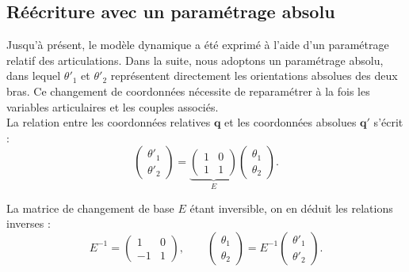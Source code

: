 \documentclass[10pt,a4paper,twocolumn]{article}
\begin{document}
\subsection{Réécriture avec un paramétrage absolu}

Jusqu'à présent, le modèle dynamique a été exprimé à l'aide d'un paramétrage 
relatif des articulations. Dans la suite, nous adoptons un paramétrage absolu, 
dans lequel $\theta'_1$ et $\theta'_2$ représentent directement les orientations 
absolues des deux bras. Ce changement de coordonnées nécessite de reparamétrer 
à la fois les variables articulaires et les couples associés. \\

La relation entre les coordonnées relatives $\mathbf{q}$ et les coordonnées absolues $\mathbf{q'}$ s'écrit :
\begin{equation}
  \begin{pmatrix}
    \theta'_1\\
    \theta'_2
  \end{pmatrix}
  =
  \underbrace{
    \begin{pmatrix}
    1 & 0\\
    1 & 1
    \end{pmatrix}
  }_{E}
  \begin{pmatrix}
    \theta_1\\
    \theta_2
  \end{pmatrix}.
\label{eq:transformation_q}
\end{equation}

La matrice de changement de base $E$ étant inversible, on en déduit les relations inverses :
\begin{equation}
  E^{-1}
  =
  \begin{pmatrix}
    1 & 0\\
    -1 & 1
  \end{pmatrix},
  \qquad
  \begin{pmatrix}
    \theta_1\\
    \theta_2
  \end{pmatrix}
  =
  E^{-1}
  \begin{pmatrix}
    \theta'_1\\
    \theta'_2
  \end{pmatrix}.
\label{eq:transformation_q_inverse}
\end{equation}
\end{document}
